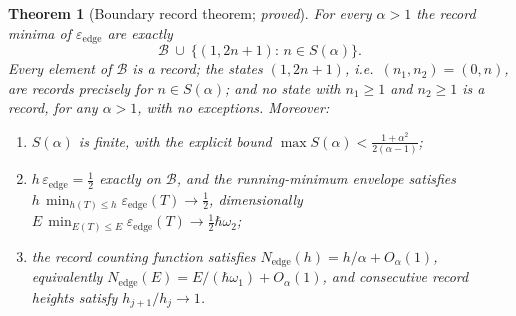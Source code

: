 \documentclass[11pt]{article}
\newtheorem{theorem}{Theorem}[section]
\theoremstyle{definition}
\theoremstyle{remark}
\newcommand{\ee}{\varepsilon_{\mathrm{edge}}}
\newcommand{\B}{\mathcal{B}}
\begin{document}
\begin{theorem}[Boundary record theorem; \emph{proved}]\label{thm:boundary}
For every $\alpha>1$ the record minima of $\ee$ are exactly
\[
\B\ \cup\ \bigl\{(1,2n+1):\,n\in S(\alpha)\bigr\}.
\]
Every element of $\B$ is a record; the states $(1,2n+1)$, i.e.\ $(n_1,n_2)=(0,n)$, are records precisely for $n\in S(\alpha)$; and no state with $n_1\ge1$ and $n_2\ge1$ is a record, for any $\alpha>1$, with no exceptions. Moreover:
\begin{enumerate}
\item[(i)] $S(\alpha)$ is finite, with the explicit bound $\displaystyle\max S(\alpha)<\frac{1+\alpha^2}{2(\alpha-1)}$;
\item[(ii)] $h\,\ee=\tfrac12$ exactly on $\B$, and the running-minimum envelope satisfies
$\displaystyle h\,\min_{h(T)\le h}\ee(T)\longrightarrow\tfrac12$, dimensionally
$\displaystyle E\,\min_{E(T)\le E}\ee(T)\to\tfrac12\hbar\omega_2$;
\item[(iii)] the record counting function satisfies $N_{\mathrm{edge}}(h)=h/\alpha+O_\alpha(1)$, equivalently $N_{\mathrm{edge}}(E)=E/(\hbar\omega_1)+O_\alpha(1)$, and consecutive record heights satisfy $h_{j+1}/h_j\to1$.
\end{enumerate}
\end{theorem}
\end{document}
